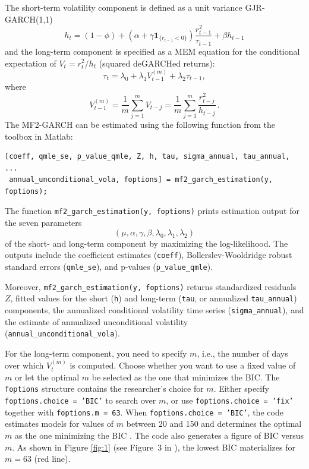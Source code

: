 \documentclass[11pt,noindent]{article}
\newcommand{\1}{\mbox{$\mathrm{1\hspace*{-2.5pt}l}$\,}}   %
\begin{document}
The short-term volatility component is defined as a unit variance GJR-GARCH(1,1)
\begin{equation}
h_t=(1-\phi)+\left(\alpha+\gamma \mathbf{1}_{\{r_{t-1}<0\}}\right) \frac{r_{t-1}^2}{\tau_{t-1}}+\beta h_{t-1}
\end{equation}
and the long-term component is specified as a MEM equation for the conditional expectation of \( V_t = r_t^2/h_t \) (squared deGARCHed returns):
\begin{equation}
\tau_t=\lambda_0+\lambda_1 V_{t-1}^{(m)}+\lambda_2 \tau_{t-1},
\end{equation}
where
\begin{equation}
V_{t-1}^{(m)}=\frac{1}{m} \sum_{j=1}^m V_{t-j}=\frac{1}{m} \sum_{j=1}^m \frac{r_{t-j}^2}{h_{t-j}}\, .
\end{equation}
The MF2-GARCH can be estimated using the following function from the toolbox in Matlab:
\begin{lstlisting}[style=Matlab-editor]
[coeff, qmle_se, p_value_qmle, Z, h, tau, sigma_annual, tau_annual, ... 
 annual_unconditional_vola, foptions] = mf2_garch_estimation(y, foptions);
\end{lstlisting}
The function \texttt{mf2\_garch\_estimation(y, foptions)} prints estimation output for the seven parameters 
$$(\mu, \alpha, \gamma, \beta, \lambda_0, \lambda_1, \lambda_2)$$ of the short- and long-term component by maximizing the log-likelihood. The outputs include the coefficient estimates (\texttt{coeff}), Bollerslev-Wooldridge robust standard errors (\texttt{qmle\_se}), and p-values (\texttt{p\_value\_qmle}).

Moreover, \texttt{mf2\_garch\_estimation(y, foptions)} returns standardized residuals \(Z\), fitted values for the short (\texttt{h}) and long-term (\texttt{tau}, or annualized \texttt{tau\_annual}) components, the annualized conditional volatility time series (\texttt{sigma\_annual}), and the estimate of annualized unconditional volatility (\texttt{annual\_unconditional\_vola}).

For the long-term component, you need to specify \( m \), i.e., the number of days over which \( V_t^{(m)} \) is computed. Choose whether you want to use a fixed value of \( m \) or let the optimal \( m \) be selected as the one that minimizes the BIC. The \texttt{foptions} structure contains the researcher's choice for \( m \). Either specify \texttt{foptions.choice = 'BIC'} to search over \(m\), or use \texttt{foptions.choice = 'fix'} together with \texttt{foptions.m = 63}. When \texttt{foptions.choice = 'BIC'}, the code estimates models for values of \( m \) between 20 and 150 and determines the optimal \( m \) as the one minimizing the BIC  \citep{Schwarz1978}. The code also generates a figure of BIC versus \( m \). As shown in Figure \ref{fig:1} (see Figure~3 in \citet{ConradEngle2021}), the lowest BIC materializes for \( m=63 \) (red line).
\end{document}
